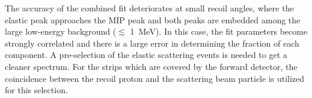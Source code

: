 \documentclass[number,5p]{elsarticle}
\begin{document}
The accuracy of the combined fit deteriorates at small recoil angles, where the elastic peak approaches the MIP peak and both peaks are embedded among the large
low-energy background ($\lesssim$ \SI{1}{\MeV}).
In this case, the fit parameters become strongly correlated and there is a large error in determining the fraction of each component.
A pre-selection of the elastic scattering events is needed to get a cleaner spectrum.
For the strips which are covered by the forward detector, the coincidence between the recoil proton and the scattering beam particle is utilized for this selection.

\end{document}
